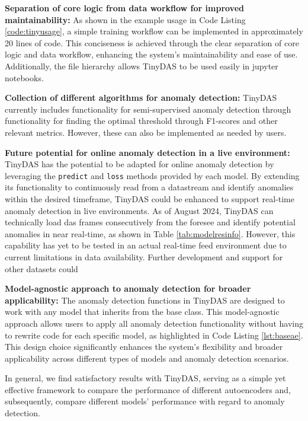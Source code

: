 \textbf{Separation of core logic from data workflow for improved maintainability:}
As shown in the example usage in Code Listing \ref{code:tinyusage}, a simple training workflow can be implemented in approximately 20 lines of code. This conciseness is achieved through the clear separation of core logic and data workflow, enhancing the system's maintainability and ease of use. Additionally, the file hierarchy allows TinyDAS to be used easily in jupyter notebooks. 

\textbf{Collection of different algorithms for anomaly detection:}
TinyDAS currently includes functionality for semi-supervised anomaly detection through functionality for finding the optimal threshold through F1-scores and other relevant metrics. However, these can also be implemented as needed by users.

\textbf{Future potential for online anomaly detection in a live environment:}
TinyDAS has the potential to be adapted for online anomaly detection by leveraging the \lstinline|predict| and \lstinline|loss| methods provided by each model. By extending its functionality to continuously read from a datastream and identify anomalies within the desired timeframe, TinyDAS could be enhanced to support real-time anomaly detection in live environments. As of August 2024, TinyDAS can technically load \acrshort{das} frames consecutively from the \acrshort{foresee} and identify potential anomalies in near real-time, as shown in Table \ref{tab:modelresinfo}. However, this capability has yet to be tested in an actual real-time feed environment due to current limitations in data availability. Further development and support for other datasets could 

\textbf{Model-agnostic approach to anomaly detection for broader applicability:}
The anomaly detection functions in TinyDAS are designed to work with any model that inherits from the base class. This model-agnostic approach allows users to apply all anomaly detection functionality without having to rewrite code for each specific model, as highlighted in Code Listing \ref{lst:baseae}. This design choice significantly enhances the system's flexibility and broader applicability across different types of models and anomaly detection scenarios.

In general, we find satisfactory results with TinyDAS, serving as a simple yet effective framework to compare the performance of different autoencoders and, subsequently, compare different models' performance with regard to anomaly detection.

